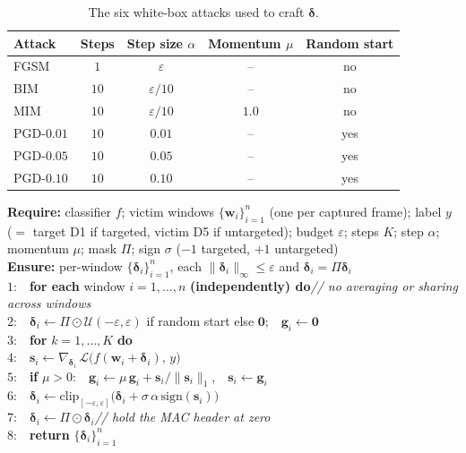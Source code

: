 \documentclass[11pt]{article}
\begin{document}
\begin{table}[t]\centering
\caption{The six white-box attacks used to craft $\boldsymbol\delta$.}
\label{tab:attacks}
\begin{tabular}{lcccc}
\hline
Attack & Steps & Step size $\alpha$ & Momentum $\mu$ & Random start\\
\hline
FGSM     & $1$  & $\varepsilon$    & --  & no\\
BIM      & $10$ & $\varepsilon/10$ & --  & no\\
MIM      & $10$ & $\varepsilon/10$ & $1.0$ & no\\
PGD-$0.01$ & $10$ & $0.01$ & -- & yes\\
PGD-$0.05$ & $10$ & $0.05$ & -- & yes\\
PGD-$0.10$ & $10$ & $0.10$ & -- & yes\\
\hline
\end{tabular}
\end{table}

\begin{algorithm}[t]
\caption{Masked $\ell_\infty$ perturbation crafting}\label{alg:craft}
{\small\setlength{\parindent}{0pt}%
\textbf{Require:} classifier $f$; victim windows $\{\mathbf w_i\}_{i=1}^{n}$ (one per captured
frame); label $y$ ($=$ target D1 if targeted, victim D5 if untargeted); budget $\varepsilon$;
steps $K$; step $\alpha$; momentum $\mu$; mask $\Pi$; sign $\sigma$ ($-1$ targeted, $+1$
untargeted)\\
\textbf{Ensure:} per-window $\{\boldsymbol\delta_i\}_{i=1}^{n}$, each
$\lVert\boldsymbol\delta_i\rVert_\infty\le\varepsilon$ and
$\boldsymbol\delta_i=\Pi\boldsymbol\delta_i$\\[2pt]
$1$:\ \ \textbf{for each} window $i=1,\dots,n$ \textbf{(independently) do}\hfill{\itshape// no averaging or sharing across windows}\\
$2$:\ \ \quad $\boldsymbol\delta_i \gets \Pi\odot\mathcal U(-\varepsilon,\varepsilon)$ if random start else
$\mathbf 0$;\ \ $\mathbf g_i\gets\mathbf 0$\\
$3$:\ \ \quad \textbf{for} $k=1,\dots,K$ \textbf{do}\\
$4$:\ \ \qquad $\mathbf s_i \gets \nabla_{\boldsymbol\delta_i}\,\mathcal L\!\big(f(\mathbf w_i+\boldsymbol\delta_i),\,y\big)$\\
$5$:\ \ \qquad \textbf{if} $\mu>0$:\ \ $\mathbf g_i \gets \mu\,\mathbf g_i + \mathbf s_i/\lVert\mathbf s_i\rVert_1$,\ \ $\mathbf s_i \gets \mathbf g_i$\\
$6$:\ \ \qquad $\boldsymbol\delta_i \gets \mathrm{clip}_{[-\varepsilon,\varepsilon]}\!\big(\boldsymbol\delta_i + \sigma\,\alpha\,\mathrm{sign}(\mathbf s_i)\big)$\\
$7$:\ \ \qquad $\boldsymbol\delta_i \gets \Pi\odot\boldsymbol\delta_i$\hfill{\itshape// hold the MAC header at zero}\\
$8$:\ \ \textbf{return} $\{\boldsymbol\delta_i\}_{i=1}^{n}$\par}
\end{algorithm}
\end{document}
